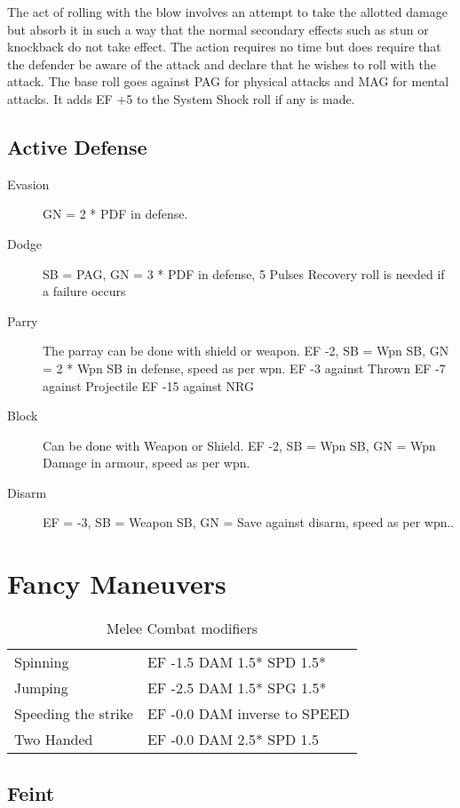 The act of rolling with the blow involves an attempt to take the 
allotted damage but absorb it in such a way that the normal secondary 
effects such as stun or knockback do not take effect. The action 
requires no time but does require that the defender be aware of the 
attack and declare that he wishes to roll with the attack. The base 
roll goes against PAG for physical attacks and MAG for mental 
attacks. It adds EF +5 to the System Shock roll if any is made.

\subsection{Active Defense}
\begin{description}
	\item[Evasion] 
    GN = 2 * PDF in defense.
	\item[Dodge] 
	SB = PAG, GN = 3 * PDF in defense, 5 Pulses
	Recovery roll is needed if a failure occurs
	\item[Parry] 
	The parray can be done with shield or weapon.
	EF -2, SB = Wpn SB, GN = 2 * Wpn SB in defense, speed as per wpn.
	EF -3 against Thrown 
	EF -7 against Projectile
	EF -15 against NRG
	\item[Block] 
	Can be done with Weapon or Shield. 
	EF -2, SB = Wpn SB, GN = Wpn Damage in armour, speed as per wpn.
	\item[Disarm] 
	EF = -3, SB = Weapon SB, GN = Save against disarm, speed as per wpn..
\end{description}
	
\section{Fancy Maneuvers}

\begin{table}[hb]
\centering
\caption{Melee Combat modifiers}
	\begin{tabular}{||l|l||} \hline
	Spinning      &          EF -1.5 DAM 1.5* SPD 1.5* \\
	Jumping       &          EF -2.5 DAM 1.5* SPG 1.5* \\
	Speeding the strike &    EF -0.0 DAM inverse to SPEED  \\
	Two Handed    &          EF -0.0 DAM 2.5* SPD 1.5  \\ \hline
	\end{tabular}
\end{table}

\subsection{Feint}

